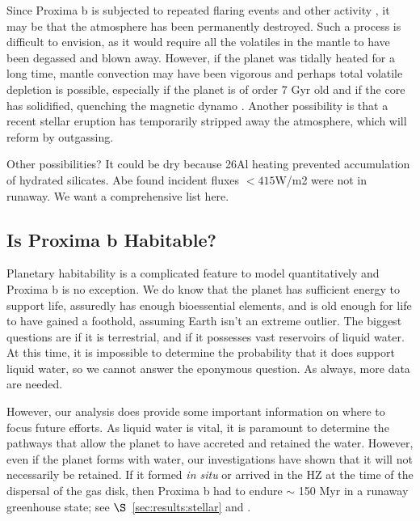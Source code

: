 \documentclass[preprint,12pt]{aastex}
\newcommand{\xxx}[1]{{\color{red} #1}} %
\begin{document}
Since Proxima b is subjected to repeated flaring events and other
activity \citep{Walker81,Davenport16}, it may be that the
atmosphere has been \xxx{permanently} destroyed. Such a process is
difficult to envision, as it would require all the volatiles in the
mantle to have been degassed and blown away. However, if the planet
was tidally heated for a long time, mantle convection may have been
vigorous and perhaps total volatile depletion is possible, especially
if the planet is of order 7 Gyr old and if the core has \xxx{solidified},
quenching the magnetic dynamo \xxx{\citep{DiscollBarnes15}}. Another possibility is that a recent
stellar eruption has temporarily stripped away the atmosphere, which
will reform by outgassing.

\xxx{Other possibilities? It could be dry because 26Al heating prevented accumulation of hydrated silicates. Abe found incident fluxes $< 415$W/m2 were not in runaway. We want a comprehensive list here.}


\subsection{Is Proxima b Habitable?}
\label{sec:results:habitable}

Planetary habitability is a complicated feature to model
quantitatively and Proxima b is no exception. We do know that the
planet has sufficient energy to support life, assuredly has enough
bioessential elements, and is old enough for life to have gained a
foothold, assuming Earth isn't an extreme outlier. The biggest
questions are if it is terrestrial, and if it possesses vast \xxx{reservoirs}
of liquid water. At this time, it is impossible to determine the
probability that it does support liquid water, so we cannot answer the
eponymous question. As always, more data are needed.

However, our analysis does provide some important information on where
to focus future efforts. As liquid water is vital, it is paramount to
determine the pathways that allow the planet to have accreted and
retained the water. However, even if the planet forms with water, our
investigations have shown that it will not necessarily be retained. If
it formed {\it in situ} or arrived in the HZ at the time of the
dispersal of the gas disk, then Proxima b had to endure $\sim$ 150
Myr in a runaway greenhouse state; see $\S$~\ref{sec:results:stellar} and
\cite{LugerBarnes15}.
\end{document}
